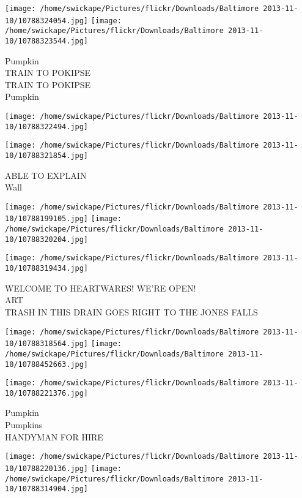 \documentclass[10pt,letterpaper]{article}
\begin{document}
\texttt{[image: /home/swickape/Pictures/flickr/Downloads/Baltimore 2013-11-10/10788324054.jpg]}
\texttt{[image: /home/swickape/Pictures/flickr/Downloads/Baltimore 2013-11-10/10788323544.jpg]}

Pumpkin\\
TRAIN TO POKIPSE\\
TRAIN TO POKIPSE\\
Pumpkin\\
\pagebreak

\texttt{[image: /home/swickape/Pictures/flickr/Downloads/Baltimore 2013-11-10/10788322494.jpg]}

\vspace{0.25in}
\texttt{[image: /home/swickape/Pictures/flickr/Downloads/Baltimore 2013-11-10/10788321854.jpg]}

ABLE TO EXPLAIN\\
Wall\\
\pagebreak

\texttt{[image: /home/swickape/Pictures/flickr/Downloads/Baltimore 2013-11-10/10788199105.jpg]}
\texttt{[image: /home/swickape/Pictures/flickr/Downloads/Baltimore 2013-11-10/10788320204.jpg]}

\vspace{0.25in}
\texttt{[image: /home/swickape/Pictures/flickr/Downloads/Baltimore 2013-11-10/10788319434.jpg]}

WELCOME TO HEARTWARES!  WE'RE OPEN!\\
ART\\
TRASH IN THIS DRAIN GOES RIGHT TO THE JONES FALLS\\
\pagebreak

\texttt{[image: /home/swickape/Pictures/flickr/Downloads/Baltimore 2013-11-10/10788318564.jpg]}
\texttt{[image: /home/swickape/Pictures/flickr/Downloads/Baltimore 2013-11-10/10788452663.jpg]}

\vspace{0.25in}
\texttt{[image: /home/swickape/Pictures/flickr/Downloads/Baltimore 2013-11-10/10788221376.jpg]}

Pumpkin\\
Pumpkins\\
HANDYMAN FOR HIRE\\
\pagebreak

\texttt{[image: /home/swickape/Pictures/flickr/Downloads/Baltimore 2013-11-10/10788220136.jpg]}
\texttt{[image: /home/swickape/Pictures/flickr/Downloads/Baltimore 2013-11-10/10788314904.jpg]}
\end{document}
